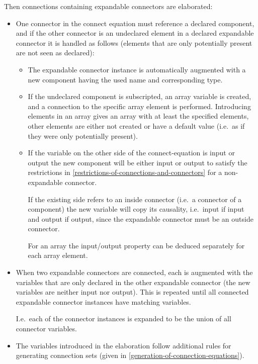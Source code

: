 Then connections containing expandable connectors are elaborated:
\begin{itemize}
\item
  One connector in the connect equation must reference a declared
  component, and if the other connector is an undeclared element in a
  declared expandable connector it is handled as follows (elements that
  are only potentially present are not seen as declared):
  \begin{itemize}
  \item
    The expandable connector instance is automatically augmented with a
    new component having the used name and corresponding type.
  \item
    If the undeclared component is subscripted, an array variable is created, and a connection to the specific array element is performed.  Introducing elements in an
    array gives an array with at least the specified elements, other elements are either not created or have a default value (i.e.\ as if they were only potentially present).
  \item
    If the variable on the other side of the connect-equation is input or output the new component will be either input or output to satisfy the restrictions in
    \cref{restrictions-of-connections-and-connectors} for a non-expandable connector.
    \begin{nonnormative}
    If the existing side refers to an inside connector (i.e.\ a connector of a component) the new variable will copy its causality, i.e.\ input
    if input and output if output, since the expandable connector must be an outside connector.
    \end{nonnormative}
    For an array the input/output property can be deduced separately for each array element.
  \end{itemize}

\item
  When two expandable connectors are connected, each is augmented with
  the variables that are only declared in the other expandable connector
  (the new variables are neither input nor output). This is repeated
  until all connected expandable connector instances have matching
  variables.
  \begin{nonnormative}
  I.e.\ each of the connector instances is expanded to be the union of all connector variables.
  \end{nonnormative}

\item
  The variables introduced in the elaboration follow additional rules
  for generating connection sets (given in \cref{generation-of-connection-equations}).


\end{itemize}
